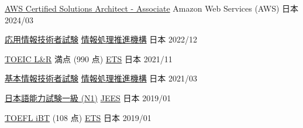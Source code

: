 
\begin{cvhonors}

  \cvhonor
  {\href{https://www.credly.com/badges/84c825b1-44c9-448f-9269-f0cb9fd1e15e/public_url}{AWS Certified Solutions Architect - Associate}} %
  {Amazon Web Services (AWS)} %
  {日本} %
  {2024/03} %

  \cvhonor
    {\href{https://www.ipa.go.jp/shiken/kubun/ap.html}{応用情報技術者試験}} %
    {\href{https://www.ipa.go.jp/index.html}{情報処理推進機構}} %
    {日本} %
    {2022/12} %

  \cvhonor
    {\href{https://www.iibc-global.org/toeic.html}{TOEIC L\&R} 満点 (990 点)} %
    {\href{https://www.ets.org/}{ETS}} %
    {日本} %
    {2021/11} %

  \cvhonor
    {\href{https://www.ipa.go.jp/shiken/kubun/fe.html}{基本情報技術者試験}} %
    {\href{https://www.ipa.go.jp/index.html}{情報処理推進機構}} %
    {日本} %
    {2021/03} %

  \cvhonor
    {\href{https://www.jlpt.jp/}{日本語能力試験一級 (N1)}} %
    {\href{http://www.jees.or.jp/}{JEES}} %
    {日本} %
    {2019/01} %

  \cvhonor
    {\href{https://www.ets.org/toefl.html}{TOEFL iBT} (108 点)} %
    {\href{https://www.ets.org/}{ETS}}%
    {日本} %
    {2019/01} %
\end{cvhonors}
